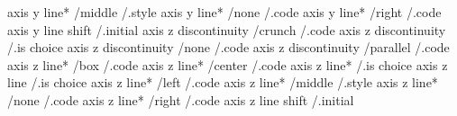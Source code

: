 axis y line*                 /middle            /.style
axis y line*                 /none              /.code
axis y line*                 /right             /.code
axis y line shift                               /.initial
axis z discontinuity         /crunch            /.code
axis z discontinuity                            /.is choice
axis z discontinuity         /none              /.code
axis z discontinuity         /parallel          /.code
axis z line*                 /box               /.code
axis z line*                 /center            /.code
axis z line*                                    /.is choice
axis z line                                     /.is choice
axis z line*                 /left              /.code
axis z line*                 /middle            /.style
axis z line*                 /none              /.code
axis z line*                 /right             /.code
axis z line shift                               /.initial

